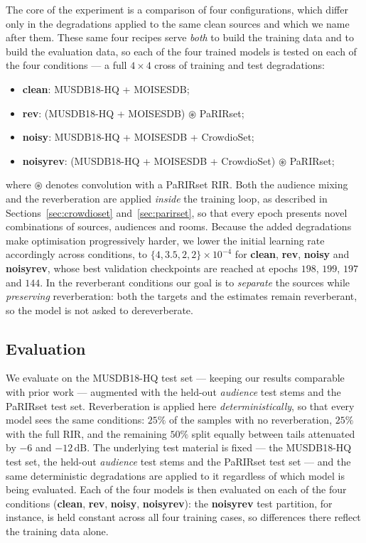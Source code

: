 \vspace{0.5cm}

The core of the experiment is a comparison of four configurations, which differ
only in the degradations applied to the same clean sources and which we name
after them. These same four recipes serve \emph{both} to build the training data
and to build the evaluation data, so each of the four trained models is tested on
each of the four conditions --- a full $4\times4$ cross of training and test
degradations:

\begin{itemize}
    \item \textbf{clean}: MUSDB18-HQ + MOISESDB;
    \item \textbf{rev}: (MUSDB18-HQ + MOISESDB) $\circledast$ PaRIRset;
    \item \textbf{noisy}: MUSDB18-HQ + MOISESDB + CrowdioSet;
    \item \textbf{noisyrev}: (MUSDB18-HQ + MOISESDB + CrowdioSet) $\circledast$ PaRIRset;
\end{itemize}
where $\circledast$ denotes convolution with a PaRIRset \acrshort{RIR}. Both the
audience mixing and the reverberation are applied \emph{inside} the training
loop, as described in Sections~\ref{sec:crowdioset} and~\ref{sec:parirset}, so
that every epoch presents novel combinations of sources, audiences and rooms.
Because the added degradations make optimisation progressively harder, we lower
the initial learning rate accordingly across conditions, to $\{4, 3.5, 2, 2\}
\times 10^{-4}$ for \textbf{clean}, \textbf{rev}, \textbf{noisy} and
\textbf{noisyrev}, whose best validation checkpoints are reached at epochs
$198$, $199$, $197$ and $144$. In the reverberant conditions our goal is to
\emph{separate} the sources while \emph{preserving} reverberation: both the
targets and the estimates remain reverberant, so the model is not asked to
dereverberate.

\subsection{Evaluation}
\label{ssec:mss_evaluation}

We evaluate on the MUSDB18-HQ test set --- keeping our results comparable with
prior work --- augmented with the held-out \emph{audience} test stems and the
PaRIRset test set. Reverberation is applied here \emph{deterministically}, so
that every model sees the same conditions: $25\%$ of the samples with no
reverberation, $25\%$ with the full \acrshort{RIR}, and the remaining $50\%$
split equally between tails attenuated by $-6$ and $-12\,\text{dB}$. The underlying test material is fixed --- the MUSDB18-HQ test set, the held-out
\emph{audience} test stems and the PaRIRset test set --- and the same
deterministic degradations are applied to it regardless of which model is being
evaluated. Each of the four models is then evaluated on each of the four
conditions (\textbf{clean}, \textbf{rev}, \textbf{noisy}, \textbf{noisyrev}): the
\textbf{noisyrev} test partition, for instance, is held constant across all four
training cases, so differences there reflect the training data alone.

